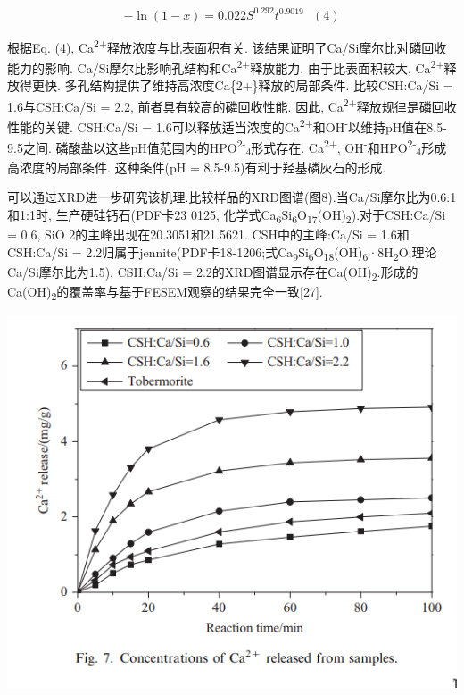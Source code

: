\documentclass[11pt]{article}
\begin{document}
\[-\ln(1-x) = 0.022S^{0.292}t^{0.9019} \ \ \ (4)\]

根据Eq. (4), Ca\textsuperscript{2+}释放浓度与比表面积有关. 该结果证明了Ca/Si摩尔比对磷回收能力的影响. Ca/Si摩尔比影响孔结构和Ca\textsuperscript{2+}释放能力. 由于比表面积较大, Ca\textsuperscript{2+}释放得更快. 多孔结构提供了维持高浓度Ca\{2+\}释放的局部条件. 比较CSH:Ca/Si = 1.6与CSH:Ca/Si = 2.2, 前者具有较高的磷回收性能. 因此, Ca\textsuperscript{2+}释放规律是磷回收性能的关键. CSH:Ca/Si = 1.6可以释放适当浓度的Ca\textsuperscript{2+}和OH\textsuperscript{-}以维持pH值在8.5-9.5之间. 磷酸盐以这些pH值范围内的HPO\textsuperscript{2-}\textsubscript{4}形式存在.\cite{liu12_remov_high_concen_phosp_by_calcit} Ca\textsuperscript{2+}, OH\textsuperscript{-}和HPO\textsuperscript{2-}\textsubscript{4}形成高浓度的局部条件. 这种条件(pH = 8.5-9.5)有利于羟基磷灰石的形成.


可以通过XRD进一步研究该机理.比较样品的XRD图谱(图8).当Ca/Si摩尔比为0.6:1和1:1时, 生产硬硅钙石(PDF卡23 0125, 化学式Ca\textsubscript{6}Si\textsubscript{6}O\textsubscript{17}(OH)\textsubscript{2}).对于CSH:Ca/Si = 0.6, SiO 2的主峰出现在20.3051和21.5621. CSH中的主峰:Ca/Si = 1.6和CSH:Ca/Si = 2.2归属于jennite(PDF卡18-1206;式Ca\textsubscript{9}Si\textsubscript{6}O\textsubscript{18}(OH)\textsubscript{6}·8H\textsubscript{2}O;理论Ca/Si摩尔比为1.5). CSH:Ca/Si = 2.2的XRD图谱显示存在Ca(OH)\textsubscript{2}.形成的Ca(OH)\textsubscript{2}的覆盖率与基于FESEM观察的结果完全一致[27].

\includegraphics[scale=0.5]{fig.7.png}
 \label{tab:title}
\end{document}
